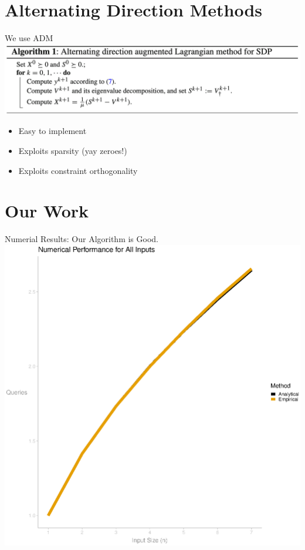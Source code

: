\documentclass[12pt]{beamer}
\begin{document}
\section{Alternating Direction Methods}
\begin{frame}{We use ADM \cite{adm}}
\centering
\includegraphics[scale=.15]{figures/adm_algorithm}
\bigskip
\begin{itemize}
    \item Easy to implement
    \item Exploits sparsity (yay zeroes!)
    \item Exploits constraint orthogonality
\end{itemize}
\end{frame}

\section{Our Work}
\begin{frame}{Numerial Results: Our Algorithm is Good.}
\centering
\includegraphics[scale=.5]{figure_all_or_complexity.eps}
\end{frame}
\end{document}
